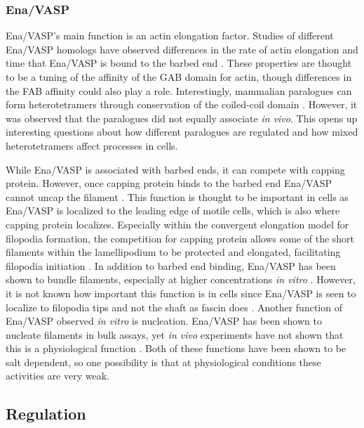 \subsubsection{Ena/VASP}
Ena/VASP's main function is an actin elongation factor. Studies of different Ena/VASP homologs have observed differences in the rate of actin elongation and time that Ena/VASP is bound to the barbed end \citep{breitsprecher_clustering_2008,breitsprecher_molecular_2011,hansen_vasp_2010,winkelman_ena/vasp_2014}. These properties are thought to be a tuning of the affinity of the GAB domain for actin, though differences in the FAB affinity could also play a role. Interestingly, mammalian paralogues can form heterotetramers through conservation of the coiled-coil domain \citep{riquelme_selectivity_2015}. However, it was observed that the paralogues did not equally associate \textit{in vivo}. This opens up interesting questions about how different paralogues are regulated and how mixed heterotetramers affect processes in cells. 

While Ena/VASP is associated with barbed ends, it can compete with capping protein. However, once capping protein binds to the barbed end Ena/VASP cannot uncap the filament \citep{applewhite_ena/vasp_2007, bear_ena/vasp:_2009, winkelman_ena/vasp_2014,barzik_ena/vasp_2005}. This function is thought to be important in cells as Ena/VASP is localized to the leading edge of motile cells, which is also where capping protein localizes. Especially within the convergent elongation model for filopodia formation, the competition for capping protein allows some of the short filaments within the lamellipodium to be protected and elongated, facilitating filopodia initiation \citep{svitkina_mechanism_2003}. 
In addition to barbed end binding, Ena/VASP has been shown to bundle filaments, especially at higher concentrations \textit{in vitro} \citep{bachmann_evh2_1999,barzik_ena/vasp_2005}. However, it is not known how important this function is in cells since Ena/VASP is seen to localize to filopodia tips and not the shaft as fascin does \citep{svitkina_mechanism_2003,lanier_mena_1999}. Another function of Ena/VASP observed \textit{in vitro} is nucleation. Ena/VASP has been shown to nucleate filaments in bulk assays, yet \textit{in vivo} experiments have not shown that this is a physiological function \citep{bear_ena/vasp:_2009}. Both of these functions have been shown to be salt dependent, so one possibility is that at physiological conditions these activities are very weak. 

\subsection{Regulation}\label{ena-formin-regulation}

